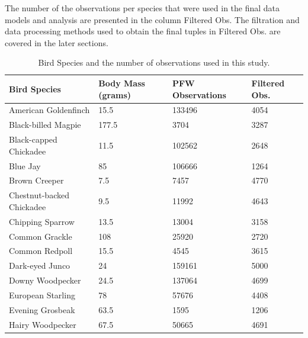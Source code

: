 The number of the observations per species that were used in the final data models and analysis are presented in the column Filtered Obs. The filtration and data processing methods used to obtain the final tuples in Filtered Obs. are covered in the later sections. 

\begin{longtable}[c]{|l|l|l|l|}
\caption{Bird Species and the number of observations used in this study.}
\label{my-label}\\
\hline
Bird Species              & Body Mass (grams) & PFW Observations & Filtered Obs. \\ \hline
\endhead
%
American Goldenfinch      & 15.5              & 133496           & 4054          \\ \hline
Black-billed Magpie       & 177.5             & 3704             & 3287          \\ \hline
Black-capped Chickadee    & 11.5              & 102562           & 2648          \\ \hline
Blue Jay                  & 85                & 106666           & 1264          \\ \hline
Brown Creeper             & 7.5               & 7457             & 4770          \\ \hline
Chestnut-backed Chickadee & 9.5               & 11992            & 4643          \\ \hline
Chipping Sparrow          & 13.5              & 13004            & 3158          \\ \hline
Common Grackle            & 108               & 25920            & 2720          \\ \hline
Common Redpoll            & 15.5              & 4545             & 3615          \\ \hline
Dark-eyed Junco           & 24                & 159161           & 5000          \\ \hline
Downy Woodpecker          & 24.5              & 137064           & 4699          \\ \hline
European Starling         & 78                & 57676            & 4408          \\ \hline
Evening Grosbeak          & 63.5              & 1595             & 1206          \\ \hline
Hairy Woodpecker          & 67.5              & 50665            & 4691          \\ \hline

\end{longtable}
